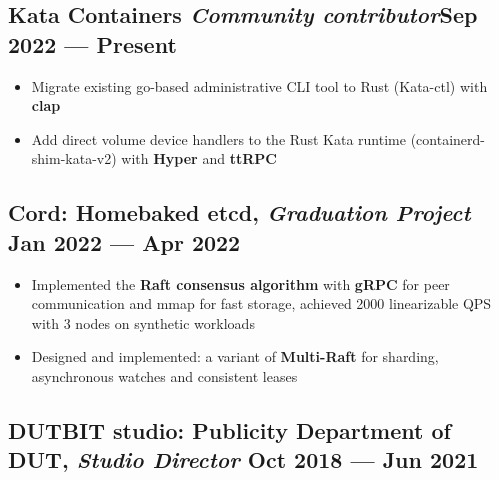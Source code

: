 \documentclass[a4,12pt]{article}
\newenvironment{zitemize}{
\begin{itemize}\itemsep0pt \parskip0pt \parsep1pt}
{\end{itemize}\vspace{-0.5cm}}
\begin{document}
\vspace{-0.2cm}

\subsection*{Kata Containers \normalfont\textit{Community contributor}\hfill \textbf{Sep 2022 --- Present}} 
\begin{zitemize}
    \item Migrate existing go-based administrative CLI tool to Rust (Kata-ctl) with \textbf{clap}
    \item Add direct volume device handlers to the Rust Kata runtime (containerd-shim-kata-v2) with \textbf{Hyper} and \textbf{ttRPC}
\end{zitemize}

\vspace{-0.1cm}
\subsection*{Cord: Homebaked etcd, \normalfont\textit{Graduation Project} \hfill \textbf{Jan 2022 --- Apr 2022}} 
\begin{zitemize}
    \item Implemented the \textbf{Raft consensus algorithm} with \textbf{gRPC} for peer communication and mmap for fast storage, achieved 2000 linearizable QPS with 3 nodes on synthetic workloads
    \item Designed and implemented: a variant of \textbf{Multi-Raft} for sharding, asynchronous watches and consistent leases
\end{zitemize}




\vspace{-0.1cm}

\subsection*{DUTBIT studio: {\normalsize\normalfont Publicity Department of DUT, \textit{Studio Director}} \hfill  Oct 2018 --- Jun 2021} 
\end{document}
